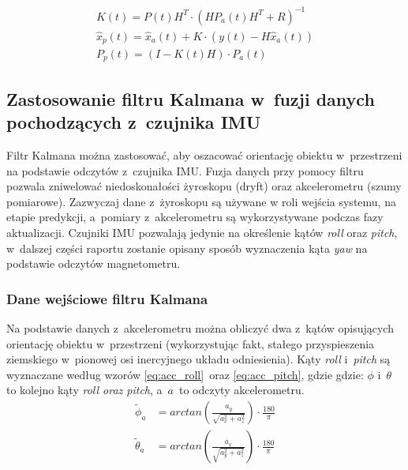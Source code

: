 \begin{gather}
	K\left(t\right) = P\left(t\right) H^T \cdot
	\left(HP_a\left(t\right)H^T + R\right)^{-1}
\label{eq:kalman_update_K} \\
	\hat{x}_p\left(t\right) = \hat{x}_a\left(t\right) +
	K\cdot\left(y\left(t\right) - H \hat{x}_a\left(t\right)\right)
\label{eq:kalman_update_x} \\
	P_p\left(t\right) = \left(I - K\left(t\right)H\right) \cdot P_a\left(t\right)
	\label{eq:kalman_update_P}
\end{gather}

\subsection{Zastosowanie filtru Kalmana w~fuzji danych pochodzących z~czujnika
            IMU}
Filtr Kalmana można zastosować, aby oszacować orientację obiektu w~przestrzeni
na podstawie odczytów z~czujnika IMU.
Fuzja danych przy pomocy filtru pozwala zniwelować niedoskonałości żyroskopu
(dryft) oraz akcelerometru (szumy pomiarowe).
Zazwyczaj dane z~żyroskopu są używane w roli wejścia systemu, na etapie
predykcji, a~pomiary z~akcelerometru są wykorzystywane podczas fazy
aktualizacji.
Czujniki IMU pozwalają jedynie na określenie kątów \textit{roll} oraz
\textit{pitch}, w~dalszej części raportu zostanie opisany sposób wyznaczenia
kąta \textit{yaw} na podstawie odczytów magnetometru.

\subsubsection{Dane wejściowe filtru Kalmana}
Na podstawie danych z~akcelerometru można obliczyć dwa z~kątów opisujących
orientację obiektu w~przestrzeni (wykorzystując fakt, stałego przyspieszenia
ziemskiego w~pionowej osi inercyjnego układu odniesienia).
Kąty \textit{roll} i~\textit{pitch} są wyznaczane według wzorów
\ref{eq:acc_roll}~oraz \ref{eq:acc_pitch}, gdzie gdzie: $ \phi $ i~$ \theta $
to kolejno kąty \textit{roll oraz pitch}, a~$ a $~to odczyty akcelerometru.
\begin{align}
	\tilde\phi_a &= arctan\left(\frac{a_y}{\sqrt{a_x^2 + a_z^2}}\right)
	\cdot
	\frac{180}{\pi}
	\label{eq:acc_roll} \\
	\tilde\theta_a &= arctan\left(\frac{a_x}{\sqrt{a_y^2 + a_z^2}}\right)
	\cdot
	\frac{180}{\pi}
	\label{eq:acc_pitch}
\end{align}

